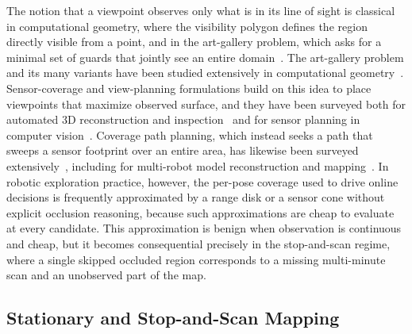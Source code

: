 \documentclass[sensors,article,submit,pdftex,moreauthors]{Definitions/mdpi}
\begin{document}
The notion that a viewpoint observes only what is in its line of sight is
classical in computational geometry, where the visibility polygon defines the
region directly visible from a point, and in the art-gallery problem, which asks
for a minimal set of guards that jointly see an entire
domain~\cite{gonzalez2002}. The art-gallery problem and its many
variants have been studied extensively in computational
geometry~\cite{orourke1987,urrutia2000}. Sensor-coverage and view-planning
formulations build on this idea to place viewpoints that maximize observed
surface, and they have been surveyed both for automated 3D reconstruction and
inspection~\cite{scott2003} and for sensor planning in computer
vision~\cite{tarabanis1995}. Coverage path planning, which instead seeks a path
that sweeps a sensor footprint over an entire area, has likewise been surveyed
extensively~\cite{choset2001,galceran2013}, including for multi-robot model
reconstruction and mapping~\cite{almadhoun2019}. In robotic exploration
practice, however, the per-pose coverage used to drive online decisions is
frequently approximated by a range disk or a sensor cone without explicit
occlusion reasoning, because such approximations are cheap to evaluate at every
candidate. This approximation is
benign when observation is continuous and cheap, but it becomes consequential
precisely in the stop-and-scan regime, where a single skipped occluded region
corresponds to a missing multi-minute scan and an unobserved part of the map.

\subsection{Stationary and Stop-and-Scan Mapping}
\end{document}
